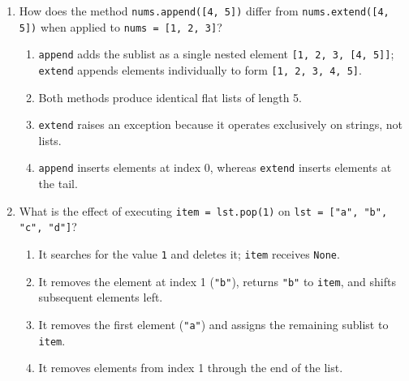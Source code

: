 \documentclass[11pt,a4paper]{article}
\begin{document}
\begin{enumerate}[label=\textbf{Q\arabic*.},leftmargin=2em,itemsep=1.5pt,topsep=1pt]
\item How does the method \texttt{nums.append([4, 5])} differ from \texttt{nums.extend([4, 5])} when applied to \texttt{nums = [1, 2, 3]}?
\begin{enumerate}[label=\Alph*.,leftmargin=2em]
  \item \texttt{append} adds the sublist as a single nested element \texttt{[1, 2, 3, [4, 5]]}; \texttt{extend} appends elements individually to form \texttt{[1, 2, 3, 4, 5]}.
  \item Both methods produce identical flat lists of length 5.
  \item \texttt{extend} raises an exception because it operates exclusively on strings, not lists.
  \item \texttt{append} inserts elements at index 0, whereas \texttt{extend} inserts elements at the tail.
\end{enumerate}

\item What is the effect of executing \texttt{item = lst.pop(1)} on \texttt{lst = ["a", "b", "c", "d"]}?
\begin{enumerate}[label=\Alph*.,leftmargin=2em]
  \item It searches for the value \texttt{1} and deletes it; \texttt{item} receives \texttt{None}.
  \item It removes the element at index 1 (\texttt{"b"}), returns \texttt{"b"} to \texttt{item}, and shifts subsequent elements left.
  \item It removes the first element (\texttt{"a"}) and assigns the remaining sublist to \texttt{item}.
  \item It removes elements from index 1 through the end of the list.
\end{enumerate}

\end{enumerate}

\newpage

\end{document}
